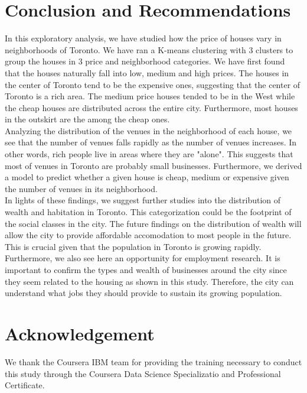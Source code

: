 \documentclass{article}
\begin{document}
\section{Conclusion and Recommendations}

In this exploratory analysis, we have studied how the price of houses vary in neighborhoods of Toronto. We have ran a K-means clustering with 3 clusters to group the houses in 3 price and neighborhood categories.  We have first found that the houses naturally fall into low, medium and high prices. The houses in the center of Toronto tend to be the expensive ones, suggesting that the center of Toronto is a rich area. The medium price houses tended to be in the West while the cheap houses are distributed across the entire city. Furthermore, most houses in the outskirt are the among the cheap ones. \\

Analyzing the distribution of the venues in the neighborhood of each house, we see that the number of venues falls rapidly as the number of venues increases. In other words, rich people live in areas where they are "alone". This suggests that most of venues in Toronto are probably small businesses. Furthermore, we derived a model to predict whether a given house is cheap, medium or expensive given the number of venues in its neighborhood. \\

In lights of these findings, we suggest further studies into the distribution of wealth and habitation in Toronto. This categorization could be the footprint of the social classes in the city. The future findings on the distribution of wealth will allow the city to provide affordable accomodation to most people in the future. This is crucial given that the population in Toronto is growing rapidly. Furthermore, we also see here an opportunity for employment research. It is important to confirm the types and wealth of businesses around the city since they seem related to the housing as shown in this study. Therefore, the city can understand what jobs they should provide to sustain its growing population.

\section{Acknowledgement}

We thank the Coursera IBM team for providing the training necessary to conduct this study through the Coursera Data Science Specializatio and Professional Certificate.




\end{document}
